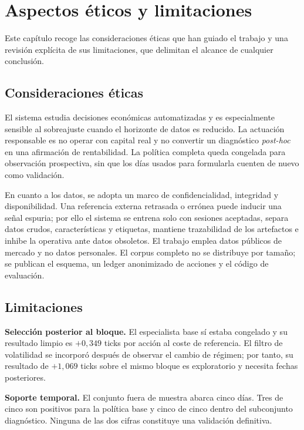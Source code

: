 %
\chapter{Aspectos éticos y limitaciones}
\label{ch::etica}

Este capítulo recoge las consideraciones éticas que han guiado el trabajo y una revisión
explícita de sus limitaciones, que delimitan el alcance de cualquier conclusión.

\section{Consideraciones éticas}

El sistema estudia decisiones económicas automatizadas y es especialmente sensible al
sobreajuste cuando el horizonte de datos es reducido. La actuación responsable es no operar
con capital real y no convertir un diagnóstico \emph{post-hoc} en una afirmación de
rentabilidad. La política completa queda congelada para observación prospectiva, sin que los
días usados para formularla cuenten de nuevo como validación.

En cuanto a los datos, se adopta un marco de confidencialidad, integridad y disponibilidad.
Una referencia externa retrasada o errónea puede inducir una señal espuria; por ello el
sistema se entrena solo con sesiones aceptadas, separa datos crudos, características y
etiquetas, mantiene trazabilidad de los artefactos e inhibe la operativa ante datos
obsoletos. El trabajo emplea datos públicos de mercado y no datos personales. El corpus
completo no se distribuye por tamaño; se publican el esquema, un ledger anonimizado de
acciones y el código de evaluación.

\section{Limitaciones}

\textbf{Selección posterior al bloque.} El especialista base sí estaba congelado y su
resultado limpio es $+0{,}349$ ticks por acción al coste de referencia. El filtro de
volatilidad se incorporó después de observar el cambio de régimen; por tanto, su resultado de
$+1{,}069$ ticks sobre el mismo bloque es exploratorio y necesita fechas posteriores.

\textbf{Soporte temporal.} El conjunto fuera de muestra abarca cinco días. Tres de cinco son
positivos para la política base y cinco de cinco dentro del subconjunto diagnóstico. Ninguna
de las dos cifras constituye una validación definitiva.

